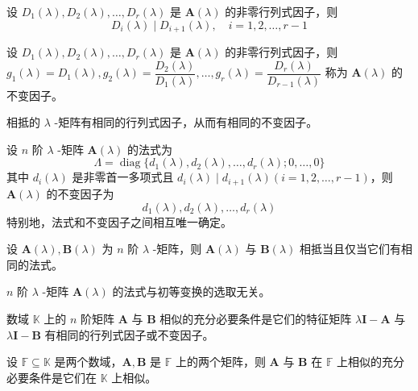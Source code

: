 \begin{lemma}
    设 $D_{1}(\lambda), D_{2}(\lambda), \ldots, D_{r}(\lambda)$ 是 $\bm{A}(\lambda)$ 的非零行列式因子，则
    \[
        D_{i}(\lambda) \mid D_{i + 1}(\lambda),\quad i = 1, 2, \ldots, r - 1
    \]
\end{lemma}

\begin{definition}
    设 $D_{1}(\lambda), D_{2}(\lambda), \ldots, D_{r}(\lambda)$ 是 $\bm{A}(\lambda)$ 的非零行列式因子，则 $g_{1}(\lambda) = D_{1}(\lambda), g_{2}(\lambda) = \dfrac{D_{2}(\lambda)}{D_{1}(\lambda)}, \ldots, g_{r}(\lambda) = \dfrac{D_{r}(\lambda)}{D_{r - 1}(\lambda)}$ 称为 $\bm{A}(\lambda)$ 的不变因子。
\end{definition}

\begin{theorem}
    相抵的 $\lambda$ -矩阵有相同的行列式因子，从而有相同的不变因子。
\end{theorem}

\begin{corollary}
    设 $n$ 阶 $\lambda$ -矩阵 $\bm{A}(\lambda)$ 的法式为
    \[
        \varLambda = \operatorname{diag}\{ d_{1}(\lambda), d_{2}(\lambda), \ldots, d_{r}(\lambda); 0, \ldots, 0 \}
    \]
    其中 $d_{i}(\lambda)$ 是非零首一多项式且 $d_{i}(\lambda) \mid d_{i + 1}(\lambda)(i = 1, 2, \ldots, r - 1)$，则 $\bm{A}(\lambda)$ 的不变因子为
    \[
        d_{1}(\lambda), d_{2}(\lambda), \ldots, d_{r}(\lambda)
    \]
    特别地，法式和不变因子之间相互唯一确定。
\end{corollary}

\begin{corollary}
    设 $\bm{A}(\lambda), \bm{B}(\lambda)$ 为 $n$ 阶 $\lambda$ -矩阵，则 $\bm{A}(\lambda)$ 与 $\bm{B}(\lambda)$ 相抵当且仅当它们有相同的法式。
\end{corollary}

\begin{corollary}
    $n$ 阶 $\lambda$ -矩阵 $\bm{A}(\lambda)$ 的法式与初等变换的选取无关。
\end{corollary}

\begin{theorem}
    数域 $\mathbb{K}$ 上的 $n$ 阶矩阵 $\bm{A}$ 与 $\bm{B}$ 相似的充分必要条件是它们的特征矩阵 $\lambda \bm{I} - \bm{A}$ 与 $\lambda \bm{I} - \bm{B}$ 有相同的行列式因子或不变因子。
\end{theorem}

\begin{corollary}
    设 $\mathbb{F} \subseteq \mathbb{K}$ 是两个数域，$\bm{A}, \bm{B}$ 是 $\mathbb{F}$ 上的两个矩阵，则 $\bm{A}$ 与 $\bm{B}$ 在 $\mathbb{F}$ 上相似的充分必要条件是它们在 $\mathbb{K}$ 上相似。
\end{corollary}


